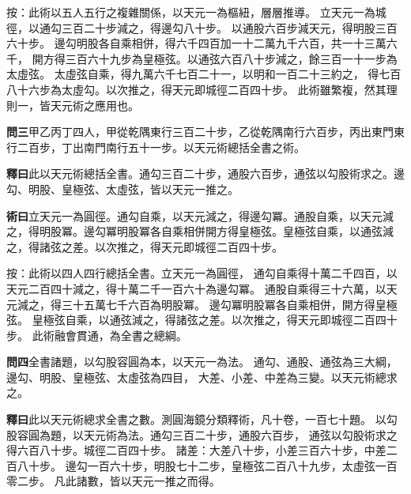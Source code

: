 \documentclass[12pt,a4paper]{article}
\begin{document}
\vspace{0.3em}

\noindent
按：此術以五人五行之複雜關係，以天元一為樞紐，層層推導。
立天元一為城徑，以通勾三百二十步減之，得邊勾八十步。
以通股六百步減天元，得明股三百六十步。
邊勾明股各自乘相併，得六千四百加一十二萬九千六百，共一十三萬六千，
開方得三百六十九步為皇極弦。以通弦六百八十步減之，餘三百一十一步為太虛弦。
太虛弦自乘，得九萬六千七百二十一，以明和一百二十三約之，
得七百八十六步為太虛勾。以次推之，得天元即城徑二百四十步。
此術雖繁複，然其理則一，皆天元術之應用也。

\vspace{0.5em}

\noindent\textbf{問三}\quad 甲乙丙丁四人，甲從乾隅東行三百二十步，乙從乾隅南行六百步，丙出東門東行二百步，丁出南門南行五十一步。以天元術總括全書之術。

\vspace{0.3em}

\noindent\textbf{釋曰}\quad 此以天元術總括全書。通勾三百二十步，通股六百步，通弦以勾股術求之。邊勾、明股、皇極弦、太虛弦，皆以天元一推之。

\vspace{0.3em}

\noindent\textbf{術曰}\quad 立天元一為圓徑。通勾自乘，以天元減之，得邊勾冪。通股自乘，以天元減之，得明股冪。邊勾冪明股冪各自乘相併開方得皇極弦。皇極弦自乘，以通弦減之，得諸弦之差。以次推之，得天元即城徑二百四十步。

\vspace{0.3em}

\noindent
按：此術以四人四行總括全書。立天元一為圓徑，
通勾自乘得十萬二千四百，以天元二百四十減之，得十萬二千一百六十為邊勾冪。
通股自乘得三十六萬，以天元減之，得三十五萬七千六百為明股冪。
邊勾冪明股冪各自乘相併，開方得皇極弦。
皇極弦自乘，以通弦減之，得諸弦之差。以次推之，得天元即城徑二百四十步。
此術融會貫通，為全書之總綱。

\vspace{0.5em}

\noindent\textbf{問四}\quad 全書諸題，以勾股容圓為本，以天元一為法。
通勾、通股、通弦為三大綱，邊勾、明股、皇極弦、太虛弦為四目，
大差、小差、中差為三變。以天元術總求之。

\vspace{0.3em}

\noindent\textbf{釋曰}\quad 此以天元術總求全書之數。測圓海鏡分類釋術，凡十卷，一百七十題。
以勾股容圓為題，以天元術為法。通勾三百二十步，通股六百步，
通弦以勾股術求之得六百八十步。城徑二百四十步。
諸差：大差八十步，小差三百六十步，中差二百八十步。
邊勾一百六十步，明股七十二步，皇極弦二百八十九步，太虛弦一百零二步。
凡此諸數，皆以天元一推之而得。
\end{document}

